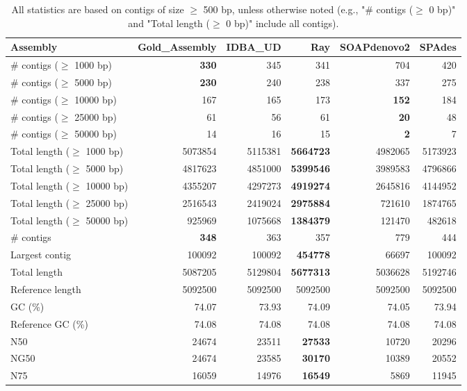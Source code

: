 \documentclass[12pt,a4paper]{article}
\begin{document}
\begin{table}[ht]
\begin{center}
\caption{All statistics are based on contigs of size $\geq$ 500 bp, unless otherwise noted (e.g., "\# contigs ($\geq$ 0 bp)" and "Total length ($\geq$ 0 bp)" include all contigs).}
\begin{tabular}{|l*{5}{|r}|}
\hline
Assembly & Gold\_Assembly & IDBA\_UD & Ray & SOAPdenovo2 & SPAdes \\ \hline
\# contigs ($\geq$ 1000 bp) & {\bf 330} & 345 & 341 & 704 & 420 \\ \hline
\# contigs ($\geq$ 5000 bp) & {\bf 230} & 240 & 238 & 337 & 275 \\ \hline
\# contigs ($\geq$ 10000 bp) & 167 & 165 & 173 & {\bf 152} & 184 \\ \hline
\# contigs ($\geq$ 25000 bp) & 61 & 56 & 61 & {\bf 20} & 48 \\ \hline
\# contigs ($\geq$ 50000 bp) & 14 & 16 & 15 & {\bf 2} & 7 \\ \hline
Total length ($\geq$ 1000 bp) & 5073854 & 5115381 & {\bf 5664723} & 4982065 & 5173923 \\ \hline
Total length ($\geq$ 5000 bp) & 4817623 & 4851000 & {\bf 5399546} & 3989583 & 4796866 \\ \hline
Total length ($\geq$ 10000 bp) & 4355207 & 4297273 & {\bf 4919274} & 2645816 & 4144952 \\ \hline
Total length ($\geq$ 25000 bp) & 2516543 & 2419024 & {\bf 2975884} & 721610 & 1874765 \\ \hline
Total length ($\geq$ 50000 bp) & 925969 & 1075668 & {\bf 1384379} & 121470 & 482618 \\ \hline
\# contigs & {\bf 348} & 363 & 357 & 779 & 444 \\ \hline
Largest contig & 100092 & 100092 & {\bf 454778} & 66697 & 100092 \\ \hline
Total length & 5087205 & 5129804 & {\bf 5677313} & 5036628 & 5192746 \\ \hline
Reference length & 5092500 & 5092500 & 5092500 & 5092500 & 5092500 \\ \hline
GC (\%) & 74.07 & 73.93 & 74.09 & 74.05 & 73.94 \\ \hline
Reference GC (\%) & 74.08 & 74.08 & 74.08 & 74.08 & 74.08 \\ \hline
N50 & 24674 & 23511 & {\bf 27533} & 10720 & 20296 \\ \hline
NG50 & 24674 & 23585 & {\bf 30170} & 10389 & 20552 \\ \hline
N75 & 16059 & 14976 & {\bf 16549} & 5869 & 11945 \\ \hline

\end{tabular}
\end{center}
\end{table}
\end{document}
